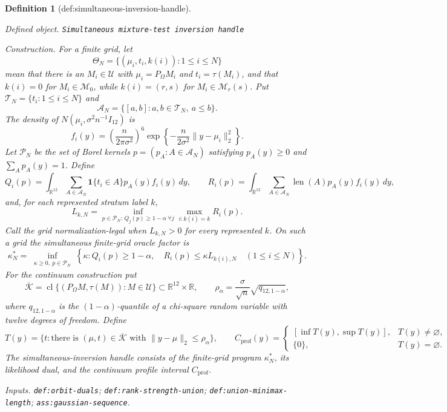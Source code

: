 \documentclass{article}
\newtheorem{definition}{Definition}
\begin{document}
\begin{definition}[def:simultaneous-inversion-handle]\label{def:simultaneous-inversion-handle}
\par\smallskip\noindent\emph{Defined object.} \texttt{Simultaneous mixture-\allowbreak{}test inversion handle}
\par\smallskip\noindent\emph{Construction.} For a finite grid, let
\[
 \Theta_N=\{(\mu_i,t_i,k(i)):1\leq i\leq N\}
\]
mean that there is an \(M_i\in\mathcal U\) with \(\mu_i=P_\Omega M_i\) and \(t_i=\tau(M_i)\), and that \(k(i)=0\) for \(M_i\in\mathcal M_0\), while \(k(i)=(r,s)\) for \(M_i\in\mathcal M_r(s)\).  Put \(\mathcal T_N=\{t_i:1\leq i\leq N\}\) and
\[
 \mathcal A_N=\{[a,b]:a,b\in\mathcal T_N,\ a\leq b\}.
\]
The density of \(N(\mu_i,\sigma^2n^{-1}I_{12})\) is
\[
 f_i(y)=\left(\frac{n}{2\pi\sigma^2}\right)^6
 \exp\!\left\{-\frac{n}{2\sigma^2}\lVert y-\mu_i\rVert_2^2\right\}.
\]
Let \(\mathcal P_N\) be the set of Borel kernels \(p=(p_A:A\in\mathcal A_N)\) satisfying \(p_A(y)\geq0\) and \(\sum_Ap_A(y)=1\).  Define
\[
 Q_i(p)=\int_{\mathbb R^{12}}\sum_{A\in\mathcal A_N}
 \mathbf 1\{t_i\in A\}p_A(y)f_i(y)\,dy,
 \qquad
 R_i(p)=\int_{\mathbb R^{12}}\sum_{A\in\mathcal A_N}
 \operatorname{len}(A)p_A(y)f_i(y)\,dy,
\]
and, for each represented stratum label \(k\),
\[
 L_{k,N}=\inf_{p\in\mathcal P_N:\,Q_j(p)\geq1-\alpha\ \forall j}
 \max_{i:k(i)=k}R_i(p).
\]
Call the grid normalization-legal when \(L_{k,N}>0\) for every represented \(k\).  On such a grid the simultaneous finite-grid oracle factor is
\[
 \kappa_N^*=\inf_{\substack{\kappa\geq0,\ p\in\mathcal P_N}}
 \left\{\kappa:Q_i(p)\geq1-\alpha,\quad
 R_i(p)\leq\kappa L_{k(i),N}\quad(1\leq i\leq N)\right\}.
\]
For the continuum construction put
\[
 \overline{\mathcal K}=\operatorname{cl}\{(P_\Omega M,\tau(M)):M\in\mathcal U\}
 \subset\mathbb R^{12}\times\mathbb R,
 \qquad
 \rho_\alpha=\frac{\sigma}{\sqrt n}\sqrt{q_{12,1-\alpha}},
\]
where \(q_{12,1-\alpha}\) is the \((1-\alpha)\)-quantile of a chi-square random variable with twelve degrees of freedom.  Define
\[
 T(y)=\{t:\text{there is }(\mu,t)\in\overline{\mathcal K}
 \text{ with }\lVert y-\mu\rVert_2\leq\rho_\alpha\},
 \qquad
 C_{\mathrm{prof}}(y)=
 \begin{cases}
 [\inf T(y),\sup T(y)],&T(y)\neq\varnothing,\\
 \{0\},&T(y)=\varnothing.
 \end{cases}
\]
The simultaneous-inversion handle consists of the finite-grid program \(\kappa_N^*\), its likelihood dual, and the continuum profile interval \(C_{\mathrm{prof}}\).
\par\smallskip\noindent\emph{Inputs.} \texttt{def:\allowbreak{}orbit-\allowbreak{}duals}; \texttt{def:\allowbreak{}rank-\allowbreak{}strength-\allowbreak{}union}; \texttt{def:\allowbreak{}union-\allowbreak{}minimax-\allowbreak{}length}; \texttt{ass:\allowbreak{}gaussian-\allowbreak{}sequence}.
\end{definition}
\end{document}

